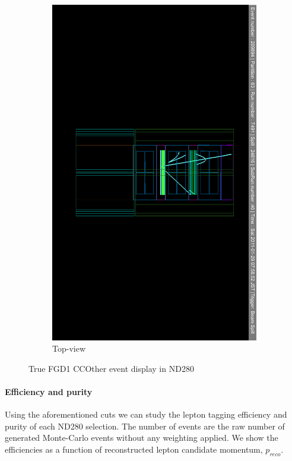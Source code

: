 \begin{itemize}
\begin{figure}[h]
\begin{subfigure}[t]{0.49\textwidth}
			\includegraphics[width=\textwidth, trim={3cm 16cm 3cm 16cm}, clip]{figures/numu/evtdisplay/CCOthers_7491_46_209894_ortX0Z_all}
			\caption{Top-view}
		\end{subfigure}
		\caption{True FGD1 CCOther event display in ND280}
		\label{fig:ccoth_evtdisplay}
	\end{figure}
\end{itemize}

\paragraph{Efficiency and purity}
Using the aforementioned cuts we can study the lepton tagging efficiency and purity of each ND280 \numu selection. The number of events are the raw number of generated Monte-Carlo events without any weighting applied. We show the efficiencies as a function of reconstructed lepton candidate momentum, $p_{reco}$.

